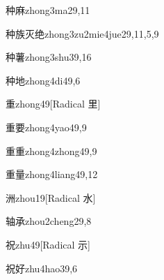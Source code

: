 \begin{verbete}{种麻}{zhong3ma2}{9,11}
\end{verbete}

\begin{verbete}{种族灭绝}{zhong3zu2mie4jue2}{9,11,5,9}
\end{verbete}

\begin{verbete}{种薯}{zhong3shu3}{9,16}
\end{verbete}

\begin{verbete}{种地}{zhong4di4}{9,6}
\end{verbete}

\begin{verbete}{重}{zhong4}{9}[Radical ⾥]
\end{verbete}

\begin{verbete}{重要}{zhong4yao4}{9,9}
\end{verbete}

\begin{verbete}{重重}{zhong4zhong4}{9,9}
\end{verbete}

\begin{verbete}{重量}{zhong4liang4}{9,12}
\end{verbete}

\begin{verbete}{洲}{zhou1}{9}[Radical 水]
\end{verbete}

\begin{verbete}{轴承}{zhou2cheng2}{9,8}
\end{verbete}

\begin{verbete}{祝}{zhu4}{9}[Radical 示]
\end{verbete}

\begin{verbete}{祝好}{zhu4hao3}{9,6}
\end{verbete}

